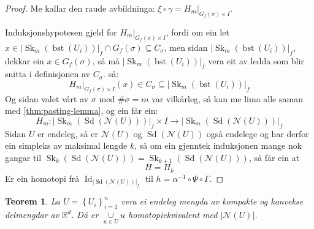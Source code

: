 \documentclass[a4paper, 12pt, norsk]{article}
\theoremstyle{plain}
\newtheorem{theorem}{Teorem}[section]
\newtheorem{lemma}[theorem]{Lemma}
\theoremstyle{definition}
\newcommand{\Rb}{\mathbb{R}}
\newcommand{\Nc}{\mathcal{N}}
\newcommand{\intersect}{ \mathop{\cap}\limits } %
\newcommand{\union}{ \mathop{\cup}\limits }
\newcommand{\gr}[1]{ \lvert #1 \rvert } %
\newcommand{\set}[1]{ \left \{ #1 \right \} } %
\newcommand{\tuple}[1]{ \left( #1 \right) } %
\DeclareMathOperator{\Sd}{Sd}
\DeclareMathOperator{\bst}{bst}
\DeclareMathOperator{\Sk}{Sk}
\DeclareMathOperator{\Id}{Id}
\begin{document}
\begin{proof}
	Me kallar den raude avbildninga: \( \xi \circ \gamma = H_m|_{G_f(\sigma) \times I} \).


	Induksjonshypotesen gjeld for \( H_m|_{G_f(\sigma) \times I} \), fordi om ein let \( x \in \gr{\Sk_m(\bst(U_i))}_f \intersect G_f(\sigma) \subseteq C_\sigma \), men sidan \( \gr{\Sk_m(\bst(U_i))}_f \), dekkar ein \( x \in G_f(\sigma) \), så må \( \gr{\Sk_m(\bst(U_i))}_f \) vera eit av ledda som blir snitta i definisjonen av \( C_\sigma \). så:
	\[
		H_m|_{G_f(\sigma) \times I}(x) \in C_\sigma \subseteq \gr{\Sk_m(\bst(U_i))}_f
	\]
	Og sidan valet vårt av \( \sigma \) med \( \#\sigma = m \) var vilkårleg, så kan me lima alle saman med \autoref{thm:pasting-lemma}, og ein får ein:
	\[
		H_m : \gr{\Sk_m(\Sd(\Nc(U)))}_f \times I \to \gr{\Sk_m(\Sd(\Nc(U)))}_f
	\]
	Sidan \( U \) er endeleg, så er \( \Nc(U) \) og \( \Sd(\Nc(U)) \) også endelege og har derfor ein simpleks av maksimal lengde \( k \), så om ein gjenntek induksjonen mange nok gangar til \( \Sk_{k}(\Sd(\Nc(U))) = \Sk_{k+1}(\Sd(\Nc(U))) \), så får ein at
	\[
		H = H_k
	\]
	Er ein homotopi frå \( \Id_{\gr{\Sd(\Nc(U))}_f} \) til \( h = \alpha^{-1} \circ \Psi \circ \Gamma \).

\end{proof}



\begin{theorem} %
	La \( U = \set{U_i}_{i=1}^n \) vera ei endeleg mengda av kompakte og konvekse delmengdar av \( \Rb^d \). Då er \( \union_{u \in U} u \) homotopiekvivalent med \( \gr{\Nc(U)} \).
\end{theorem}
\end{document}
